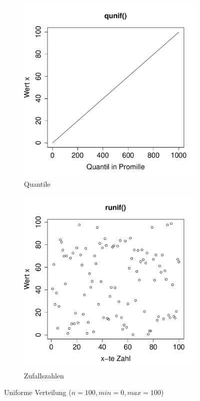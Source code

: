 \begin{figure}[h!]
\begin{subfigure}[b]{0.48\textwidth}
\includegraphics{verteilungen-058}
\caption{Quantile}
\end{subfigure}
\begin{subfigure}[b]{0.48\textwidth}
\includegraphics{verteilungen-059}
\caption{Zufallszahlen}
\end{subfigure}
\caption{Uniforme Verteilung ($n=100, min=0, max=100$)}
\label{fig:unif}
\end{figure}

